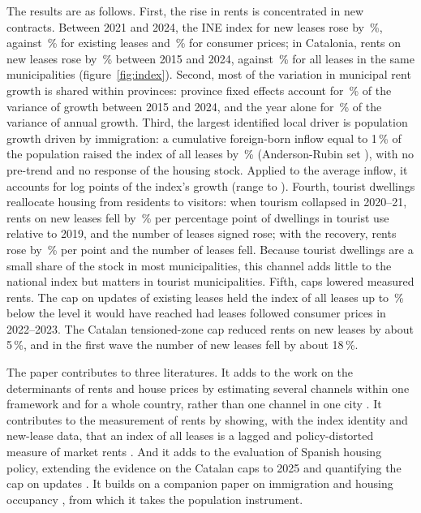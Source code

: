\documentclass[11pt,a4paper]{article}
\begin{document}
The results are as follows. First, the rise in rents is concentrated in new contracts. Between 2021 and 2024, the INE index for new leases rose by \newGrowth\,\%, against \existGrowth\,\% for existing leases and \cpiTwoOne\,\% for consumer prices; in Catalonia, rents on new leases rose by \catNew\,\% between 2015 and 2024, against \catStock\,\% for all leases in the same municipalities (figure~\ref{fig:index}). Second, most of the variation in municipal rent growth is shared within provinces: province fixed effects account for \vsLdProv\,\% of the variance of growth between 2015 and 2024, and the year alone for \vsYear\,\% of the variance of annual growth. Third, the largest identified local driver is population growth driven by immigration: a cumulative foreign-born inflow equal to 1\,\% of the population raised the index of all leases by \bPop\,\% (Anderson-Rubin set \bPopAR), with no pre-trend and no response of the housing stock. Applied to the average inflow, it accounts for \cPop{} log points of the index's growth (range \cPopLo{} to \cPopHi). Fourth, tourist dwellings reallocate housing from residents to visitors: when tourism collapsed in 2020--21, rents on new leases fell by \tRCovid\,\% per percentage point of dwellings in tourist use relative to 2019, and the number of leases signed rose; with the recovery, rents rose by \tRRecov\,\% per point and the number of leases fell. Because tourist dwellings are a small share of the stock in most municipalities, this channel adds little to the national index but matters in tourist municipalities. Fifth, caps lowered measured rents. The cap on updates of existing leases held the index of all leases up to \capGap\,\% below the level it would have reached had leases followed consumer prices in 2022--2023. The Catalan tensioned-zone cap reduced rents on new leases by about 5\,\%, and in the first wave the number of new leases fell by about 18\,\%.

The paper contributes to three literatures. It adds to the work on the determinants of rents and house prices by estimating several channels within one framework and for a whole country, rather than one channel in one city \citep{saiz2007,garcialopez2020,barron2021}. It contributes to the measurement of rents by showing, with the index identity and new-lease data, that an index of all leases is a lagged and policy-distorted measure of market rents \citep{genesove2003,ambrose2015}. And it adds to the evaluation of Spanish housing policy, extending the evidence on the Catalan caps to 2025 and quantifying the cap on updates \citep{jofre2023,perez2026}. It builds on a companion paper on immigration and housing occupancy \citep{fernandez2026}, from which it takes the population instrument.
\end{document}
